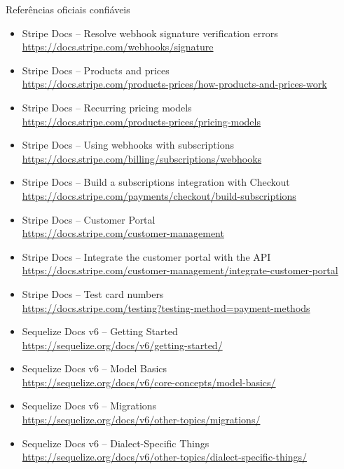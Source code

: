 \documentclass[aspectratio=169]{beamer}
\begin{document}
\begin{frame}[allowframebreaks]{Referências oficiais confiáveis}
\begin{itemize}
  \item Stripe Docs -- Resolve webhook signature verification errors\\
  \url{https://docs.stripe.com/webhooks/signature}

  \item Stripe Docs -- Products and prices\\
  \url{https://docs.stripe.com/products-prices/how-products-and-prices-work}

  \item Stripe Docs -- Recurring pricing models\\
  \url{https://docs.stripe.com/products-prices/pricing-models}

  \item Stripe Docs -- Using webhooks with subscriptions\\
  \url{https://docs.stripe.com/billing/subscriptions/webhooks}

  \item Stripe Docs -- Build a subscriptions integration with Checkout\\
  \url{https://docs.stripe.com/payments/checkout/build-subscriptions}

  \item Stripe Docs -- Customer Portal\\
  \url{https://docs.stripe.com/customer-management}

  \item Stripe Docs -- Integrate the customer portal with the API\\
  \url{https://docs.stripe.com/customer-management/integrate-customer-portal}

  \item Stripe Docs -- Test card numbers\\
  \url{https://docs.stripe.com/testing?testing-method=payment-methods}

  \item Sequelize Docs v6 -- Getting Started\\
  \url{https://sequelize.org/docs/v6/getting-started/}

  \item Sequelize Docs v6 -- Model Basics\\
  \url{https://sequelize.org/docs/v6/core-concepts/model-basics/}

  \item Sequelize Docs v6 -- Migrations\\
  \url{https://sequelize.org/docs/v6/other-topics/migrations/}

  \item Sequelize Docs v6 -- Dialect-Specific Things\\
  \url{https://sequelize.org/docs/v6/other-topics/dialect-specific-things/}
\end{itemize}
\end{frame}
\end{document}

